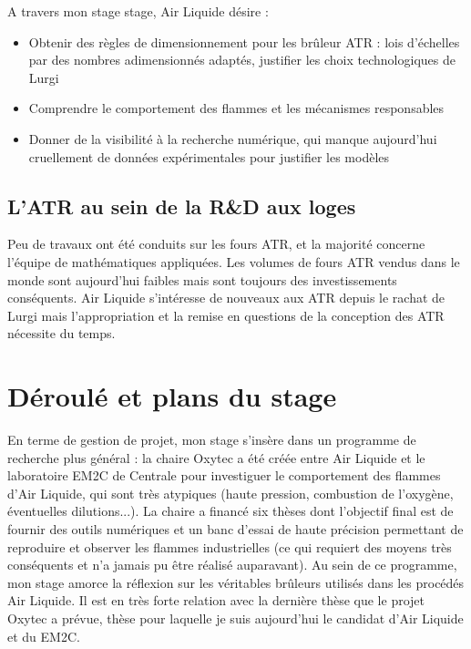 A travers mon stage stage, Air Liquide désire :
\begin{itemize}
\item Obtenir des règles de dimensionnement pour les brûleur ATR : lois d'échelles par des nombres adimensionnés adaptés, justifier les choix technologiques de Lurgi
\item Comprendre le comportement des flammes et les mécanismes responsables
\item Donner de la visibilité à la recherche numérique, qui manque aujourd'hui cruellement de données expérimentales pour justifier les modèles
\end{itemize}



\subsection{L'ATR au sein de la R\&D aux loges}

 Peu de travaux ont été conduits sur les fours ATR, et la majorité concerne l'équipe de mathématiques appliquées. Les volumes de fours ATR vendus dans le monde sont aujourd'hui faibles mais sont toujours des investissements conséquents. Air Liquide s'intéresse de nouveaux aux ATR depuis le rachat de Lurgi mais l'appropriation et la remise en questions de la conception des ATR nécessite du temps.

\section{Déroulé et plans du stage}


En terme de gestion de projet, mon stage s'insère dans un programme de recherche plus général : la chaire Oxytec a été créée entre Air Liquide et le laboratoire EM2C de Centrale pour investiguer le comportement des flammes d'Air Liquide, qui sont très atypiques (haute pression, combustion de l'oxygène, éventuelles dilutions...). La chaire a financé six thèses dont l'objectif final est de fournir des outils numériques et un banc d'essai de haute précision permettant de reproduire et observer les flammes industrielles (ce qui requiert des moyens très conséquents et n'a jamais pu être réalisé auparavant). Au sein de ce programme, mon stage amorce la réflexion sur les véritables brûleurs utilisés dans les procédés Air Liquide. Il est en très forte relation avec la dernière thèse que le projet Oxytec a prévue, thèse pour laquelle je suis aujourd'hui le candidat d'Air Liquide et du EM2C.

